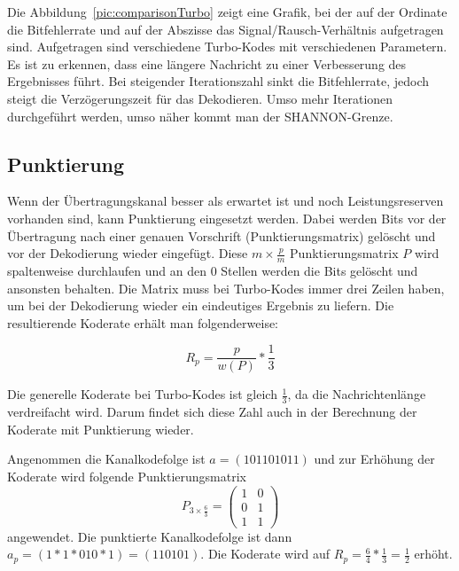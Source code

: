 Die Abbildung~\ref{pic:comparisonTurbo} zeigt eine Grafik, bei der auf der Ordinate die Bitfehlerrate und auf der Abszisse das Signal/Rausch-Verhältnis  aufgetragen sind. Aufgetragen sind verschiedene Turbo-Kodes mit verschiedenen Parametern. Es ist zu erkennen, dass eine längere Nachricht zu einer Verbesserung des Ergebnisses führt. Bei steigender Iterationszahl sinkt die Bitfehlerrate, jedoch steigt die Verzögerungszeit für das Dekodieren. Umso mehr Iterationen durchgeführt werden, umso näher kommt man der SHANNON-Grenze.

\FloatBarrier
\subsection{Punktierung}
\label{sec:puncturing}
Wenn der Übertragungskanal besser als erwartet ist und noch Leistungsreserven vorhanden sind, kann Punktierung eingesetzt werden. Dabei werden Bits vor der Übertragung nach einer genauen Vorschrift (Punktierungsmatrix) gelöscht und vor der Dekodierung wieder eingefügt. Diese $m \times \frac{p}{m}$ Punktierungsmatrix $P$  wird spaltenweise durchlaufen und an den 0 Stellen werden die Bits gelöscht und ansonsten behalten. Die Matrix muss bei Turbo-Kodes immer drei Zeilen haben, um bei der Dekodierung wieder ein eindeutiges Ergebnis zu liefern. Die resultierende Koderate erhält man folgenderweise:

\begin{equation}
R_p = \frac{p}{w(P)} * \frac{1}{3}
\end{equation} 

Die generelle Koderate bei Turbo-Kodes ist gleich $\frac{1}{3}$, da die Nachrichtenlänge verdreifacht wird. Darum findet sich diese Zahl auch in der Berechnung der Koderate mit Punktierung wieder. \cite[218]{schoenfeld2012informations}

\begin{e_exa}
Angenommen die Kanalkodefolge ist $a=(101101011)$ und zur Erhöhung der Koderate wird folgende Punktierungsmatrix $$P_{3 \times \frac{6}{3}}=\begin{pmatrix}
1 & 0 \\
0 & 1 \\
1 & 1
\end{pmatrix}$$ angewendet. Die punktierte Kanalkodefolge ist dann $a_p=(1*1*010*1)=(110101)$. Die Koderate wird auf $R_p = \frac{6}{4} * \frac{1}{3} = \frac{1}{2}$ erhöht. 
\end{e_exa}